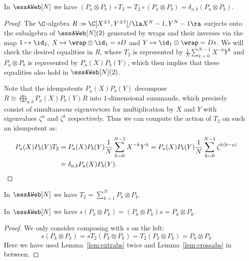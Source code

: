 \begin{lemma}\label{lem:extrabs} In $\essAWeb[N]$ we have $(P_a\otimes P_b)\circ T_2 = T_2\circ (P_a\otimes P_b) = \delta_{a,b}(P_a\otimes P_b)$.
\end{lemma}
\begin{proof} The $\C$-algebra $R:=\C[X^{\pm 1},Y^{\pm 1}]/\la X^N-1,Y^N-1\ra$ surjects onto the subalgebra of $\essAWeb[N](2)$ generated by wraps and their inverses via the map $1 \mapsto \id_2$, $X\mapsto \wrap\otimes \id_1=sD$ and $Y\mapsto \id_1\otimes \wrap=Ds$. We will check the desired equalities in $R$, where $T_2$ is represented by $\frac{1}{N}\sum_{k=0}^{N-1} X^{-k}Y^k$ and $P_a\otimes P_b$ is represented by $P_a(X)P_b(Y)$, which then implies that these equalities also hold in $\essAWeb[N](2)$.

Note that the idempotents $P_a(X)P_b(Y)$ decompose $R\cong \bigoplus_{a,b} P_a(X)P_b(Y) R$ into $1$-dimensional summands, which precisely consist of simultaneous eigenvectors for multiplication by $X$ and $Y$ with eigenvalues $\zeta^a$ and $\zeta^b$ respectively. Thus we can compute the action of $T_2$ on such an idempotent as:
\begin{align*}
  P_a(X)P_b(Y)T_2 &= P_a(X)P_b(Y) \frac{1}{N}\sum_{k=0}^{N-1} X^{-k}Y^k = P_a(X)P_b(Y) \frac{1}{N}\sum_{k=0}^{N-1} \zeta^{k(b-a)}\\
  &= \delta_{a,b}P_a(X)P_b(Y). \qedhere
\end{align*}

\end{proof}
\begin{coro}\label{cor:Ttwo} In $\essAWeb[N]$ we have 
 $T_2=\sum_{k=1}^N P_k\otimes P_k$.
\end{coro}


\begin{coro}\label{cor:crossabs} In $\essAWeb[N]$ we have $s(P_k\otimes P_k)=(P_k\otimes P_k)s=P_k\otimes P_k $.
\end{coro}
\begin{proof} We only consider composing with $s$ on the left:
\[s(P_k\otimes P_k)=s T_2(P_k\otimes P_k)=T_2(P_k\otimes P_k)=P_k\otimes P_k\]
Here we have used Lemma~\ref{lem:extrabs} twice and Lemma~\ref{lem:crossabs} in between.
\end{proof}

